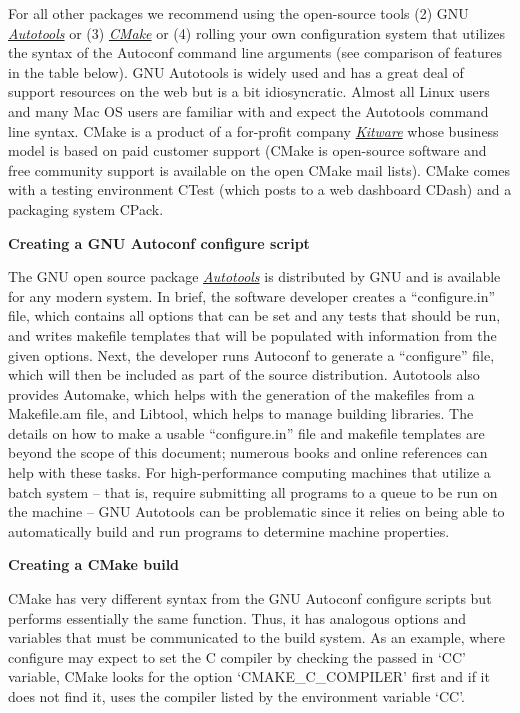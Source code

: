 \documentclass[]{article}
\begin{document}
For all other packages we recommend using the open-source tools (2) GNU
\href{https://en.wikipedia.org/wiki/GNU_build_system}{\emph{Autotools}}
or (3) \href{https://cmake.org/}{\emph{CMake}} or (4) rolling your own
configuration system that utilizes the syntax of the Autoconf command
line arguments (see comparison of features in the table below). GNU
Autotools is widely used and has a great deal of support resources on
the web but is a bit idiosyncratic. Almost all Linux users and many Mac
OS users are familiar with and expect the Autotools command line syntax.
CMake is a product of a for-profit company
\href{http://www.kitware.com}{\emph{Kitware}} whose business model is
based on paid customer support (CMake is open-source software and free
community support is available on the open CMake mail lists). CMake
comes with a testing environment CTest (which posts to a web dashboard
CDash) and a packaging system CPack.

\textbf{Creating a GNU Autoconf configure script}

The GNU open source package
\href{http://www.gnu.org/software/autoconf/}{\emph{Autotools}} is
distributed by GNU and is available for any modern system. In brief, the
software developer creates a ``configure.in'' file, which contains all
options that can be set and any tests that should be run, and writes
makefile templates that will be populated with information from the
given options. Next, the developer runs Autoconf to generate a
``configure'' file, which will then be included as part of the source
distribution. Autotools also provides Automake, which helps with the
generation of the makefiles from a Makefile.am file, and Libtool, which
helps to manage building libraries. The details on how to make a usable
``configure.in'' file and makefile templates are beyond the scope of
this document; numerous books and online references can help with these
tasks. For high-performance computing machines that utilize a batch
system -- that is, require submitting all programs to a queue to be run
on the machine -- GNU Autotools can be problematic since it relies on
being able to automatically build and run programs to determine machine
properties.

\textbf{Creating a CMake build}

CMake has very different syntax from the GNU Autoconf configure scripts
but performs essentially the same function. Thus, it has analogous
options and variables that must be communicated to the build system. As
an example, where configure may expect to set the C compiler by checking
the passed in `CC' variable, CMake looks for the option
`CMAKE\_C\_COMPILER' first and if it does not find it, uses the compiler
listed by the environment variable `CC'.
\end{document}
